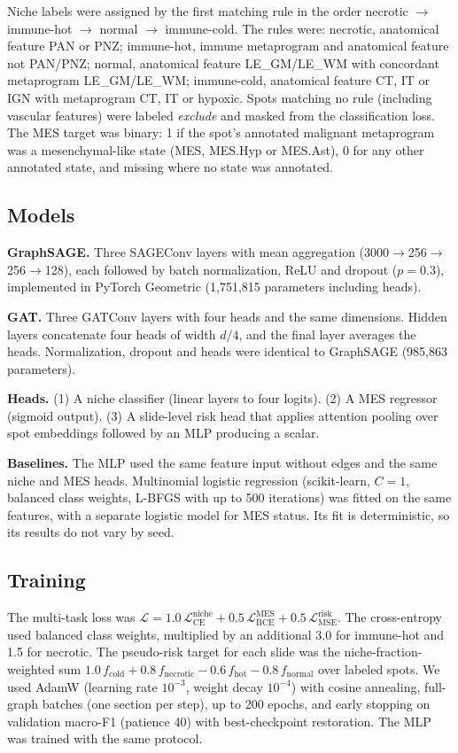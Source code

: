 \documentclass[11pt,letterpaper]{article}
\begin{document}
Niche labels were assigned by the first matching rule in the order necrotic $\rightarrow$ immune-hot $\rightarrow$ normal $\rightarrow$ immune-cold. The rules were: necrotic, anatomical feature PAN or PNZ; immune-hot, immune metaprogram and anatomical feature not PAN/PNZ; normal, anatomical feature LE\_GM/LE\_WM with concordant metaprogram LE\_GM/LE\_WM; immune-cold, anatomical feature CT, IT or IGN with metaprogram CT, IT or hypoxic. Spots matching no rule (including vascular features) were labeled \emph{exclude} and masked from the classification loss. The MES target was binary: 1 if the spot's annotated malignant metaprogram was a mesenchymal-like state (MES, MES.Hyp or MES.Ast), 0 for any other annotated state, and missing where no state was annotated.

\subsection{Models}

\textbf{GraphSAGE.} Three SAGEConv layers \cite{hamilton2017} with mean aggregation (3000$\rightarrow$256$\rightarrow$256$\rightarrow$128), each followed by batch normalization, ReLU and dropout ($p = 0.3$), implemented in PyTorch Geometric \cite{fey2019} (1{,}751{,}815 parameters including heads).

\textbf{GAT.} Three GATConv layers \cite{velickovic2018} with four heads and the same dimensions. Hidden layers concatenate four heads of width $d/4$, and the final layer averages the heads. Normalization, dropout and heads were identical to GraphSAGE (985{,}863 parameters).

\textbf{Heads.} (1) A niche classifier (linear layers to four logits). (2) A MES regressor (sigmoid output). (3) A slide-level risk head that applies attention pooling over spot embeddings followed by an MLP producing a scalar.

\textbf{Baselines.} The MLP used the same feature input without edges and the same niche and MES heads. Multinomial logistic regression (scikit-learn, $C = 1$, balanced class weights, L-BFGS with up to 500 iterations) was fitted on the same features, with a separate logistic model for MES status. Its fit is deterministic, so its results do not vary by seed.

\subsection{Training}

The multi-task loss was $\mathcal{L} = 1.0\,\mathcal{L}_\mathrm{CE}^\mathrm{niche} + 0.5\,\mathcal{L}_\mathrm{BCE}^\mathrm{MES} + 0.5\,\mathcal{L}_\mathrm{MSE}^\mathrm{risk}$. The cross-entropy used balanced class weights, multiplied by an additional 3.0 for immune-hot and 1.5 for necrotic. The pseudo-risk target for each slide was the niche-fraction-weighted sum $1.0\,f_\mathrm{cold} + 0.8\,f_\mathrm{necrotic} - 0.6\,f_\mathrm{hot} - 0.8\,f_\mathrm{normal}$ over labeled spots. We used AdamW (learning rate $10^{-3}$, weight decay $10^{-4}$) with cosine annealing, full-graph batches (one section per step), up to 200 epochs, and early stopping on validation macro-F1 (patience 40) with best-checkpoint restoration. The MLP was trained with the same protocol.
\end{document}
